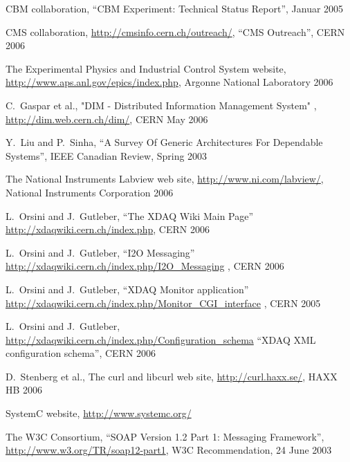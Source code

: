 
CBM collaboration, ``CBM Experiment: Technical Status Report'', Januar 2005

CMS collaboration, \hyperref{http://cmsinfo.cern.ch/outreach/}{}{}{http://cmsinfo.cern.ch/outreach/}, ``CMS Outreach'', CERN 2006

The Experimental Physics and  Industrial Control System website,
\hyperref{http://www.aps.anl.gov/epics/index.php}{}{}{http://www.aps.anl.gov/epics/index.php},
Argonne National Laboratory 2006

C.~Gaspar et al., "DIM - Distributed Information Management System" ,
\hyperref{http://dim.web.cern.ch/dim/}{}{}{http://dim.web.cern.ch/dim/},
CERN May 2006

Y.~Liu and P.~Sinha,
``A Survey Of Generic Architectures For Dependable Systems'',
IEEE Canadian Review, Spring 2003

The National Instruments Labview web site, 
\hyperref{http://www.ni.com/labview/}{}{}{http://www.ni.com/labview/},
National Instruments Corporation 2006

L.~Orsini and J.~Gutleber, ``The XDAQ Wiki Main Page''
 \hyperref{http://xdaqwiki.cern.ch/index.php}{}{}{http://xdaqwiki.cern.ch/index.php}, 
 CERN 2006

L.~Orsini and J.~Gutleber, ``I2O Messaging'' \hyperref{http://xdaqwiki.cern.ch/index.php/I2O\_Messaging}{}{}{http://xdaqwiki.cern.ch/index.php/I2O\_Messaging}  , CERN 2006

L.~Orsini and J.~Gutleber, ``XDAQ Monitor application'' \hyperref{http://xdaqwiki.cern.ch/index.php/Monitor\_CGI\_interface}{}{}{http://xdaqwiki.cern.ch/index.php/Monitor\_CGI\_interface} , CERN 2005

L.~Orsini and J.~Gutleber, \hyperref{http://xdaqwiki.cern.ch/index.php/Configuration\_schema}{}{}{http://xdaqwiki.cern.ch/index.php/Configuration\_schema} ``XDAQ XML configuration schema'', CERN 2006

 D.~Stenberg et al., The curl and libcurl web site, 
\hyperref{http://curl.haxx.se/}{}{}{http://curl.haxx.se/},
HAXX HB 2006

SystemC website, \hyperref{http://www.systemc.org/}{}{}{http://www.systemc.org/}

The W3C Consortium, ``SOAP Version 1.2 Part 1: Messaging Framework'', \hyperref{http://www.w3.org/TR/soap12-part1}{}{}{http://www.w3.org/TR/soap12-part1}, W3C Recommendation, 24 June 2003

